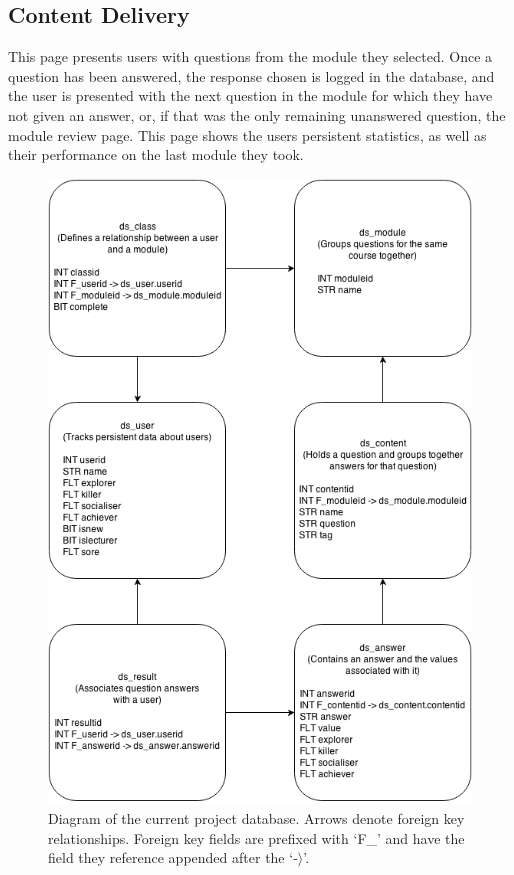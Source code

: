 \documentclass[10pt,a4paper]{report}
\begin{document}
\subsection*{Content Delivery}
This page presents users with questions from the module they selected. Once a question has been answered, the response chosen is logged in the database, and the user is presented with the next question in the module for which they have not given an answer, or, if that was the only remaining unanswered question, the module review page. This page shows the users persistent statistics, as well as their performance on the last module they took.

\begin{figure}
	\includegraphics[width=\textwidth]{../img/database.png}
	\caption{Diagram of the current project database. Arrows denote foreign key relationships. Foreign key fields are prefixed with `F\_' and have the field they reference appended after the `-$\rangle$'.}
	\label{db}
\end{figure}
\end{document}
